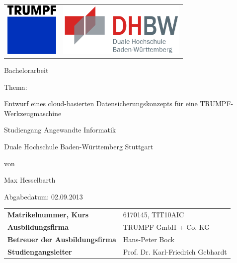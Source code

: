 \begin{longtable}{p{} p{}}	
	{\includegraphics[height=2.6cm]{_images/cover/TruLogo}} & 
	{\includegraphics[height=2.6cm]{_images/cover/dhbw}}	  
\end{longtable}
	
\begin{center}	
	\vspace{10mm}
		
	\begin{Huge}
		Bachelorarbeit
    \end{Huge}
    
	\vspace{15mm}
		
	\begin{Large}
		Thema:
	\end{Large}
	
	\vspace{5mm}
	
	\begin{LARGE}	
		Entwurf eines cloud-basierten Datensicherungskonzepts für eine TRUMPF-Werkzeugmaschine\\
	\end{LARGE}
	
	\vspace{15mm}
	
	\begin{large}
		Studiengang Angewandte Informatik
	
		Duale Hochschule Baden-Württemberg Stuttgart
	
		\vspace{10mm}
			
		von
			
		Max Hesselbarth		
	
		\vspace{10mm}
			
		Abgabedatum: 02.09.2013		
	\end{large}

	\vspace{10mm}		
\end{center}
	
\vfill %
	
\begin{tabular}{l l}
	{\bf Matrikelnummer, Kurs} & 6170145, TIT10AIC\\
	{\bf Ausbildungsfirma} & TRUMPF GmbH + Co. KG\\
	{\bf Betreuer der Ausbildungsfirma} & Hans-Peter Bock\\
	{\bf Studiengangsleiter} & Prof. Dr. Karl-Friedrich Gebhardt\\
\end{tabular}
	